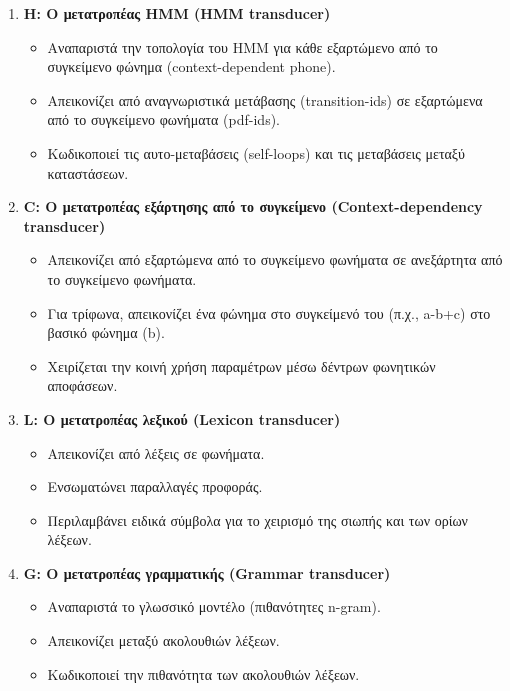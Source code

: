 \documentclass[a4paper,12pt]{article}
\begin{document}
\begin{enumerate}
    \item \textbf{H: Ο μετατροπέας HMM (HMM transducer)}
    \begin{itemize}
        \item Αναπαριστά την τοπολογία του HMM για κάθε εξαρτώμενο από το συγκείμενο φώνημα (context-dependent phone).
        \item Απεικονίζει από αναγνωριστικά μετάβασης (transition-ids) σε εξαρτώμενα από το συγκείμενο φωνήματα (pdf-ids).
        \item Κωδικοποιεί τις αυτο-μεταβάσεις (self-loops) και τις μεταβάσεις μεταξύ καταστάσεων.
    \end{itemize}
    
    \item \textbf{C: Ο μετατροπέας εξάρτησης από το συγκείμενο (Context-dependency transducer)}
    \begin{itemize}
        \item Απεικονίζει από εξαρτώμενα από το συγκείμενο φωνήματα σε ανεξάρτητα από το συγκείμενο φωνήματα.
        \item Για τρίφωνα, απεικονίζει ένα φώνημα στο συγκείμενό του (π.χ., a-b+c) στο βασικό φώνημα (b).
        \item Χειρίζεται την κοινή χρήση παραμέτρων μέσω δέντρων φωνητικών αποφάσεων.
    \end{itemize}
    
    \item \textbf{L: Ο μετατροπέας λεξικού (Lexicon transducer)}
    \begin{itemize}
        \item Απεικονίζει από λέξεις σε φωνήματα.
        \item Ενσωματώνει παραλλαγές προφοράς.
        \item Περιλαμβάνει ειδικά σύμβολα για το χειρισμό της σιωπής και των ορίων λέξεων.
    \end{itemize}
    
    \item \textbf{G: Ο μετατροπέας γραμματικής (Grammar transducer)}
    \begin{itemize}
        \item Αναπαριστά το γλωσσικό μοντέλο (πιθανότητες n-gram).
        \item Απεικονίζει μεταξύ ακολουθιών λέξεων.
        \item Κωδικοποιεί την πιθανότητα των ακολουθιών λέξεων.
    \end{itemize}
\end{enumerate}
\end{document}

